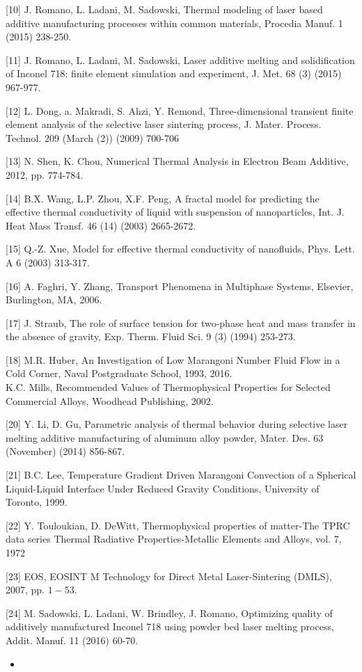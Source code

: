 \documentclass[10pt]{article}
\begin{document}
[10] J. Romano, L. Ladani, M. Sadowski, Thermal modeling of laser based additive manufacturing processes within common materials, Procedia Manuf. 1 (2015) 238-250.

[11] J. Romano, L. Ladani, M. Sadowski, Laser additive melting and solidification of Inconel 718: finite element simulation and experiment, J. Met. 68 (3) (2015) 967-977.

[12] L. Dong, a. Makradi, S. Ahzi, Y. Remond, Three-dimensional transient finite element analysis of the selective laser sintering process, J. Mater. Process. Technol. 209 (March (2)) (2009) 700-706

[13] N. Shen, K. Chou, Numerical Thermal Analysis in Electron Beam Additive, 2012, pp. 774-784.

[14] B.X. Wang, L.P. Zhou, X.F. Peng, A fractal model for predicting the effective thermal conductivity of liquid with suspension of nanoparticles, Int. J. Heat Mass Transf. 46 (14) (2003) 2665-2672.

[15] Q.-Z. Xue, Model for effective thermal conductivity of nanofluids, Phys. Lett. A 6 (2003) 313-317.

[16] A. Faghri, Y. Zhang, Transport Phenomena in Multiphase Systems, Elsevier, Burlington, MA, 2006.

[17] J. Straub, The role of surface tension for two-phase heat and mass transfer in the absence of gravity, Exp. Therm. Fluid Sci. 9 (3) (1994) 253-273.

[18] M.R. Huber, An Investigation of Low Marangoni Number Fluid Flow in a Cold Corner, Naval Postgraduate School, 1993, 2016.\\
[19] K.C. Mills, Recommended Values of Thermophysical Properties for Selected Commercial Alloys, Woodhead Publishing, 2002.

[20] Y. Li, D. Gu, Parametric analysis of thermal behavior during selective laser melting additive manufacturing of aluminum alloy powder, Mater. Des. 63 (November) (2014) 856-867.

[21] B.C. Lee, Temperature Gradient Driven Marangoni Convection of a Spherical Liquid-Liquid Interface Under Reduced Gravity Conditions, University of Toronto, 1999.

[22] Y. Touloukian, D. DeWitt, Thermophysical properties of matter-The TPRC data series Thermal Radiative Properties-Metallic Elements and Alloys, vol. 7, 1972

[23] EOS, EOSINT M Technology for Direct Metal Laser-Sintering (DMLS), 2007, pp. $1-53$.

[24] M. Sadowski, L. Ladani, W. Brindley, J. Romano, Optimizing quality of additively manufactured Inconel 718 using powder bed laser melting process, Addit. Manuf. 11 (2016) 60-70.

\begin{itemize}
  \item 
\end{itemize}
\end{document}
